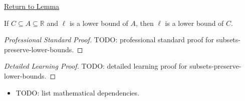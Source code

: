 \newpage
{}
\label{prf:subsets-preserve-lower-bounds}

\begin{remark*}[Return]
\hyperref[lem:subsets-preserve-lower-bounds]{Return to Lemma}
\end{remark*}

\begin{lemma*}
If $C\subseteq A\subseteq\mathbb{R}$ and $\ell$ is a lower bound of $A$,
then $\ell$ is a lower bound of $C$.
\end{lemma*}

\begin{proof}[Professional Standard Proof]
\LRAProofBodyStart
TODO: professional standard proof for subsets-preserve-lower-bounds.
\end{proof}

\begin{proof}[Detailed Learning Proof]
\LRAProofBodyStart
TODO: detailed learning proof for subsets-preserve-lower-bounds.
\end{proof}

\begin{remark*}
\end{remark*}

\begin{dependencies}
\begin{itemize}
  \item TODO: list mathematical dependencies.
\end{itemize}
\end{dependencies}

\clearpage
